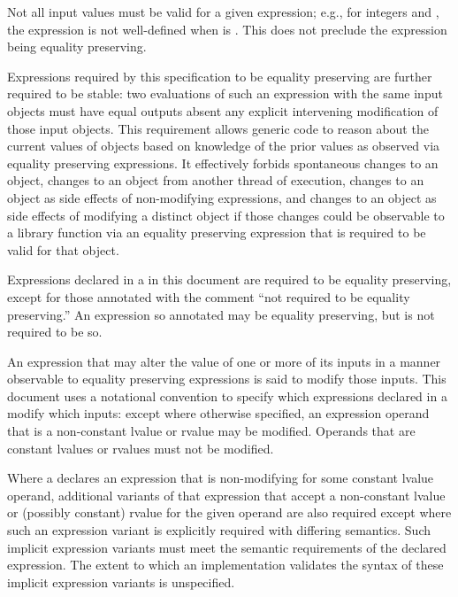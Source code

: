 \begin{addedblock}
\pnum
Not all input values must be valid for a given expression; e.g., for integers 
and , the expression  is not well-defined when  is . This
does not preclude the expression  being equality preserving. 


\pnum
Expressions required by this specification to be equality preserving are
further required to be stable: two evaluations of such an expression with the same
input objects must have equal outputs absent any
explicit intervening modification of those input objects.
\enternote This requirement allows generic code to reason
about the current values of objects based on knowledge of the prior values as
observed via equality preserving expressions. It effectively forbids spontaneous
changes to an object, changes to an object from another thread of execution, changes
to an object as side effects of non-modifying expressions, and changes to an object as
side effects of modifying a distinct object if those changes could be observable
to a library function via an equality preserving expression that is required to be
valid for that object. \exitnote

\pnum
Expressions declared in a  in this document are
required to be equality preserving, except for those annotated with the comment
``not required to be equality preserving.'' An expression so annotated
may be equality preserving, but is not required to be so.

\pnum
An expression that may alter the value of one or more of its inputs in a manner
observable to equality preserving expressions is said to modify those inputs.
This document uses a notational convention to specify which expressions declared
in a  modify which inputs: except where otherwise
specified, an expression operand that is a non-constant lvalue or rvalue may be
modified. Operands that are constant lvalues or rvalues must not be modified.

\pnum
Where a  declares an expression that is non-modifying
for some constant lvalue operand, additional variants of that expression that accept
a non-constant lvalue or (possibly constant) rvalue for the given operand are also
required except where such an expression variant is explicitly required with
differing semantics. Such implicit expression variants must meet the semantic
requirements of the declared expression. The extent to which an implementation
validates the syntax of these implicit expression variants is unspecified.


\end{addedblock}
